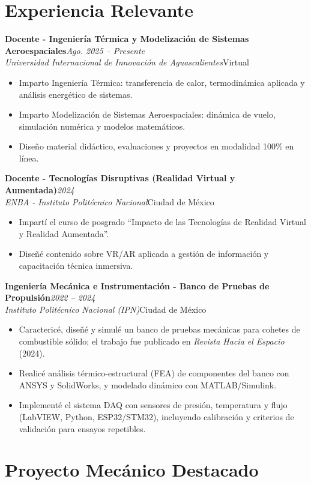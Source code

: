 \documentclass[10pt,a4paper]{article}
\newcommand{\resumeItem}[1]{\item\small #1}
\newcommand{\resumeSubheading}[4]{%
  \vspace{3pt}\noindent
  \textbf{#1}\hfill{\small\textit{\color{graytext}#2}}\\
  \textit{\color{graytext}#3}\hfill{\small\color{graytext}#4}\vspace{2pt}
}
\newcommand{\resumeItemListStart}{\begin{itemize}[leftmargin=1.15em,itemsep=1pt,topsep=2pt,partopsep=0pt,parsep=0pt]}
\newcommand{\resumeItemListEnd}{\end{itemize}\vspace{2pt}}
\begin{document}
\section{Experiencia Relevante}

\resumeSubheading
{Docente - Ingenier\'ia T\'ermica y Modelizaci\'on de Sistemas Aeroespaciales}{Ago. 2025 -- Presente}
{Universidad Internacional de Innovaci\'on de Aguascalientes}{Virtual}
\resumeItemListStart
  \resumeItem{Imparto Ingenier\'ia T\'ermica: transferencia de calor, termodin\'amica aplicada y an\'alisis energ\'etico de sistemas.}
  \resumeItem{Imparto Modelizaci\'on de Sistemas Aeroespaciales: din\'amica de vuelo, simulaci\'on num\'erica y modelos matem\'aticos.}
  \resumeItem{Dise\~no material did\'actico, evaluaciones y proyectos en modalidad 100\% en l\'inea.}
\resumeItemListEnd

\resumeSubheading
{Docente - Tecnolog\'ias Disruptivas (Realidad Virtual y Aumentada)}{2024}
{ENBA - Instituto Polit\'ecnico Nacional}{Ciudad de M\'exico}
\resumeItemListStart
  \resumeItem{Impart\'i el curso de posgrado ``Impacto de las Tecnolog\'ias de Realidad Virtual y Realidad Aumentada''.}
  \resumeItem{Dise\~n\'e contenido sobre VR/AR aplicada a gesti\'on de informaci\'on y capacitaci\'on t\'ecnica inmersiva.}
\resumeItemListEnd

\resumeSubheading
{Ingenier\'ia Mec\'anica e Instrumentaci\'on - Banco de Pruebas de Propulsi\'on}{2022 -- 2024}
{Instituto Polit\'ecnico Nacional (IPN)}{Ciudad de M\'exico}
\resumeItemListStart
  \resumeItem{Caracteric\'e, dise\~n\'e y simul\'e un banco de pruebas mec\'anicas para cohetes de combustible s\'olido; el trabajo fue publicado en \textit{Revista Hacia el Espacio} (2024).}
  \resumeItem{Realic\'e an\'alisis t\'ermico-estructural (FEA) de componentes del banco con ANSYS y SolidWorks, y modelado din\'amico con MATLAB/Simulink.}
  \resumeItem{Implement\'e el sistema DAQ con sensores de presi\'on, temperatura y flujo (LabVIEW, Python, ESP32/STM32), incluyendo calibraci\'on y criterios de validaci\'on para ensayos repetibles.}
\resumeItemListEnd

\section{Proyecto Mec\'anico Destacado}
\end{document}
